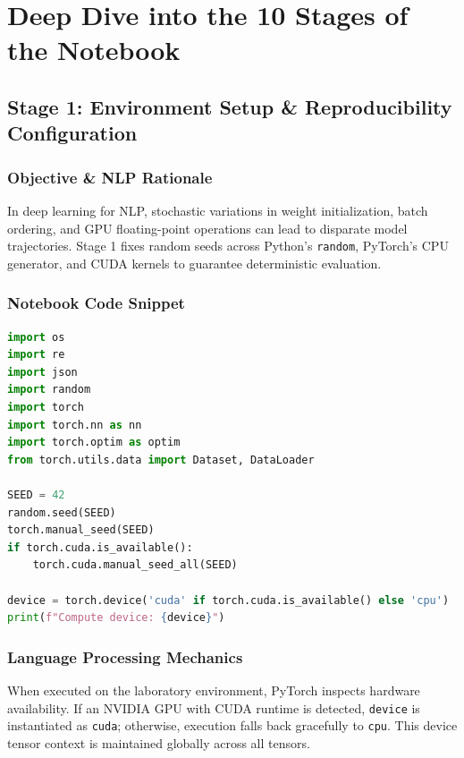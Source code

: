 \documentclass[11pt,a4paper]{article}
\begin{document}
\newpage

\section{Deep Dive into the 10 Stages of the Notebook}

\subsection{Stage 1: Environment Setup \& Reproducibility Configuration}

\subsubsection{Objective \& NLP Rationale}
In deep learning for NLP, stochastic variations in weight initialization, batch ordering, and GPU floating-point operations can lead to disparate model trajectories. Stage 1 fixes random seeds across Python's \texttt{random}, PyTorch's CPU generator, and CUDA kernels to guarantee deterministic evaluation.

\subsubsection{Notebook Code Snippet}
\begin{lstlisting}[language=Python]
import os
import re
import json
import random
import torch
import torch.nn as nn
import torch.optim as optim
from torch.utils.data import Dataset, DataLoader

SEED = 42
random.seed(SEED)
torch.manual_seed(SEED)
if torch.cuda.is_available():
    torch.cuda.manual_seed_all(SEED)

device = torch.device('cuda' if torch.cuda.is_available() else 'cpu')
print(f"Compute device: {device}")
\end{lstlisting}

\subsubsection{Language Processing Mechanics}
When executed on the laboratory environment, PyTorch inspects hardware availability. If an NVIDIA GPU with CUDA runtime is detected, \texttt{device} is instantiated as \texttt{cuda}; otherwise, execution falls back gracefully to \texttt{cpu}. This device tensor context is maintained globally across all tensors.
\end{document}
